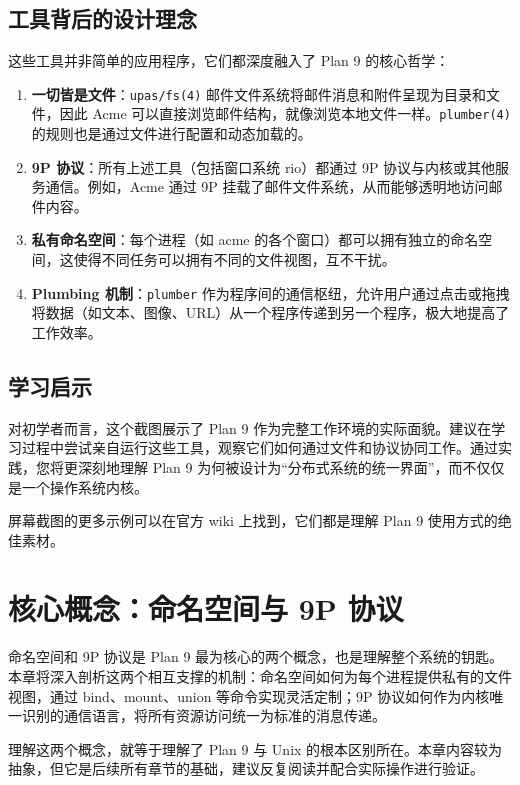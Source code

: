 \documentclass[12pt,UTF8]{ctexbook}
\begin{document}
\section{工具背后的设计理念}

这些工具并非简单的应用程序，它们都深度融入了 Plan 9 的核心哲学：

\begin{enumerate}
\item \textbf{一切皆是文件}：\texttt{upas/fs(4)} 邮件文件系统将邮件消息和附件呈现为目录和文件，因此 Acme 可以直接浏览邮件结构，就像浏览本地文件一样。\texttt{plumber(4)} 的规则也是通过文件进行配置和动态加载的。
\item \textbf{9P 协议}：所有上述工具（包括窗口系统 rio）都通过 9P 协议与内核或其他服务通信。例如，Acme 通过 9P 挂载了邮件文件系统，从而能够透明地访问邮件内容。
\item \textbf{私有命名空间}：每个进程（如 acme 的各个窗口）都可以拥有独立的命名空间，这使得不同任务可以拥有不同的文件视图，互不干扰。
\item \textbf{Plumbing 机制}：\texttt{plumber} 作为程序间的通信枢纽，允许用户通过点击或拖拽将数据（如文本、图像、URL）从一个程序传递到另一个程序，极大地提高了工作效率。
\end{enumerate}

\section{学习启示}

对初学者而言，这个截图展示了 Plan 9 作为完整工作环境的实际面貌。建议在学习过程中尝试亲自运行这些工具，观察它们如何通过文件和协议协同工作。通过实践，您将更深刻地理解 Plan 9 为何被设计为“分布式系统的统一界面”，而不仅仅是一个操作系统内核。

屏幕截图的更多示例可以在官方 wiki 上找到，它们都是理解 Plan 9 使用方式的绝佳素材。
	
\chapter{核心概念：命名空间与 9P 协议}

命名空间和 9P 协议是 Plan 9 最为核心的两个概念，也是理解整个系统的钥匙。本章将深入剖析这两个相互支撑的机制：命名空间如何为每个进程提供私有的文件视图，通过 bind、mount、union 等命令实现灵活定制；9P 协议如何作为内核唯一识别的通信语言，将所有资源访问统一为标准的消息传递。

理解这两个概念，就等于理解了 Plan 9 与 Unix 的根本区别所在。本章内容较为抽象，但它是后续所有章节的基础，建议反复阅读并配合实际操作进行验证。
	
\end{document}
